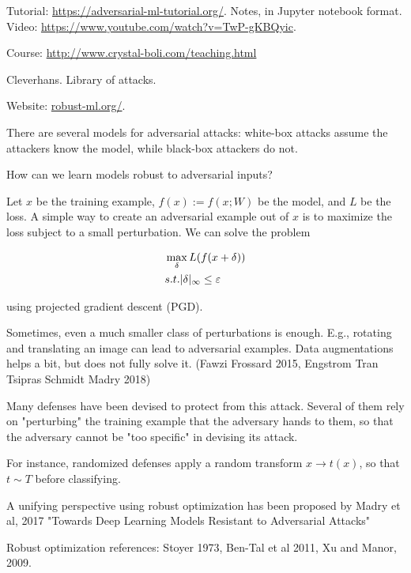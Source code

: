 \documentclass[english]{article}
\begin{document}
Tutorial: \url{https://adversarial-ml-tutorial.org/}. Notes, in Jupyter notebook format. Video: \url{https://www.youtube.com/watch?v=TwP-gKBQyic}.

Course: \url{http://www.crystal-boli.com/teaching.html}


Cleverhans. Library of attacks. 

Website: \url{robust-ml.org/}.


\item There are several models for adversarial attacks: white-box attacks assume the attackers know the model, while black-box attackers do not. 

\item How can we learn models robust to adversarial inputs?

\item Let $x$ be the training example, $f(x):=f(x;W)$ be the model, and  $L$ be the loss. A simple way to create an adversarial example out of $x$ is to maximize the loss subject to a small perturbation. We can solve the problem 

\begin{align*}
&\max_\delta L(f(x+\delta))\\
&s.t. |\delta|_\infty \le \varepsilon
\end{align*}

using projected gradient descent (PGD).

\item Sometimes, even a much smaller class of perturbations is enough. E.g., rotating and translating an image can lead to adversarial examples. Data augmentations helps a bit, but does not fully solve it. (Fawzi Frossard 2015, Engstrom Tran Tsipras Schmidt Madry 2018) 

\item Many defenses have been devised to protect from this attack. Several of them rely on "perturbing" the training example that the adversary hands to them, so that the adversary cannot be "too specific" in devising its attack. 

For instance, randomized defenses apply a random transform $x\to t(x)$, so that $t\sim T$ before classifying.

\item A unifying perspective using robust optimization has been proposed by Madry et al, 2017 "Towards Deep Learning Models Resistant to Adversarial Attacks"

Robust optimization references: Stoyer 1973, Ben-Tal et al 2011, Xu and Manor, 2009. 
\end{document}
